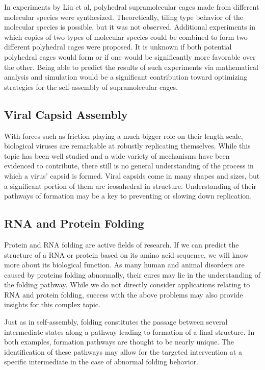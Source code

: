 \documentclass[12pt]{article}
\begin{document}
In experiments by Liu et al, polyhedral supramolecular cages made from different molecular species were synthesized. Theoretically, tiling type behavior of the molecular species is possible, but it was not observed. Additional experiments in which copies of two types of molecular species could be combined to form two different polyhedral cages were proposed. It is unknown if both potential polyhedral cages would form or if one would be significantly more favorable over the other. Being able to predict the results of such experiments via mathematical analysis and simulation would be a significant contribution toward optimizing strategies for the self-assembly of supramolecular cages. 

\subsection{Viral Capsid Assembly}

With forces such as friction playing a much bigger role on their length scale, biological viruses are remarkable at robustly replicating themselves. While this topic has been well studied and a wide variety of mechanisms have been evidenced to contribute, there still is no general understanding of the process in which a virus' capsid is formed. Viral capsids come in many shapes and sizes, but a significant portion of them are icosahedral in structure. Understanding of their pathways of formation may be a key to preventing or slowing down replication.  

\subsection{RNA and Protein Folding}

Protein and RNA folding are active fields of research. If we can predict the structure of a RNA or protein based on its amino acid sequence, we will know more about its biological function. As many human and animal disorders are caused by proteins folding abnormally, their cures may lie in the understanding of the folding pathway. While we do not directly consider applications relating to RNA and protein folding, success with the above problems may also provide insights for this complex topic. 

Just as in self-assembly, folding constitutes the passage between several intermediate states along a pathway leading to formation of a final structure. In both examples, formation pathways are thought to be nearly unique. The identification of these pathways may allow for the targeted intervention at a specific intermediate in the case of abnormal folding behavior. 
\end{document}
